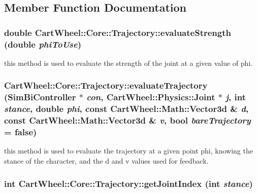 \subsection{Member Function Documentation}
\hypertarget{classCartWheel_1_1Core_1_1Trajectory_a18b33b11d97d6bc9be5860779232769b}{
\subsubsection[{evaluateStrength}]{\setlength{\rightskip}{0pt plus 5cm}double CartWheel::Core::Trajectory::evaluateStrength (double {\em phiToUse})}}
\label{classCartWheel_1_1Core_1_1Trajectory_a18b33b11d97d6bc9be5860779232769b}
this method is used to evaluate the strength of the joint at a given value of phi. \hypertarget{classCartWheel_1_1Core_1_1Trajectory_a90afd8e8c9b341ebb895e7fdd783bfbd}{
\subsubsection[{evaluateTrajectory}]{ CartWheel::Core::Trajectory::evaluateTrajectory ({\bf SimBiController} $\ast$ {\em con}, \/  {\bf CartWheel::Physics::Joint} $\ast$ {\em j}, \/  int {\em stance}, \/  double {\em phi}, \/  const {\bf CartWheel::Math::Vector3d} \& {\em d}, \/  const {\bf CartWheel::Math::Vector3d} \& {\em v}, \/  bool {\em bareTrajectory} = {\ttfamily false})}}
\label{classCartWheel_1_1Core_1_1Trajectory_a90afd8e8c9b341ebb895e7fdd783bfbd}
this method is used to evaluate the trajectory at a given point phi, knowing the stance of the character, and the d and v values used for feedback. \hypertarget{classCartWheel_1_1Core_1_1Trajectory_a76eaf0a8f08de66c1524b4d515c34c7a}{
\subsubsection[{getJointIndex}]{\setlength{\rightskip}{0pt plus 5cm}int CartWheel::Core::Trajectory::getJointIndex (int {\em stance})}}

